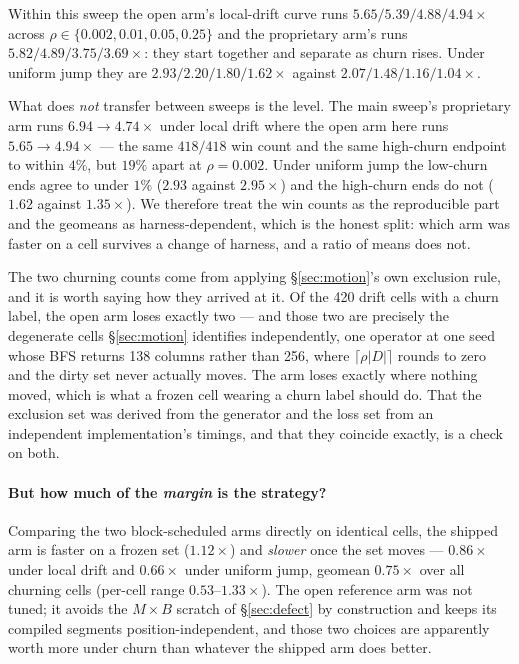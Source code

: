 \documentclass{article}
\begin{document}
Within this sweep the open arm's local-drift curve runs $5.65 / 5.39 / 4.88 /
4.94\times$ across $\rho \in \{0.002, 0.01, 0.05, 0.25\}$ and the proprietary
arm's runs $5.82 / 4.89 / 3.75 / 3.69\times$: they start together and separate as
churn rises. Under uniform jump they are $2.93 / 2.20 / 1.80 / 1.62\times$
against $2.07 / 1.48 / 1.16 / 1.04\times$.

What does \emph{not} transfer between sweeps is the level. The main sweep's
proprietary arm runs $6.94 \to 4.74\times$ under local drift where the open arm
here runs $5.65 \to 4.94\times$ --- the same $418/418$ win count and the same
high-churn endpoint to within $4\%$, but $19\%$ apart at $\rho{=}0.002$. Under
uniform jump the low-churn ends agree to under $1\%$ ($2.93$ against $2.95\times$)
and the high-churn ends do not ($1.62$ against $1.35\times$). We therefore treat
the win counts as the reproducible part and the geomeans as harness-dependent,
which is the honest split: which arm was faster on a cell survives a change of
harness, and a ratio of means does not.

The two churning counts come from applying \S\ref{sec:motion}'s own exclusion
rule, and it is worth saying how they arrived at it. Of the 420 drift cells with
a churn label, the open arm loses exactly two --- and those two are precisely the
degenerate cells \S\ref{sec:motion} identifies independently, one operator at one
seed whose BFS returns 138 columns rather than 256, where $\lceil \rho|D| \rceil$
rounds to zero and the dirty set never actually moves. The arm loses exactly
where nothing moved, which is what a frozen cell wearing a churn label should do.
That the exclusion set was derived from the generator and the loss set from an
independent implementation's timings, and that they coincide exactly, is a check
on both.

\paragraph{But how much of the \emph{margin} is the strategy?}
Comparing the two block-scheduled arms directly on identical cells, the shipped
arm is faster on a frozen set ($1.12\times$) and \emph{slower} once the set moves
--- $0.86\times$ under local drift and $0.66\times$ under uniform jump, geomean
$0.75\times$ over all churning cells (per-cell range $0.53$--$1.33\times$). The open reference arm was not tuned; it
avoids the $M{\times}B$ scratch of \S\ref{sec:defect} by construction and keeps
its compiled segments position-independent, and those two choices are apparently
worth more under churn than whatever the shipped arm does better.
\end{document}
